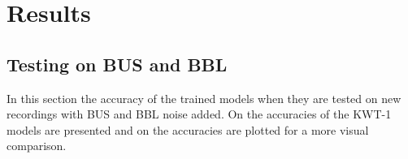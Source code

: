 \section{Results} \label{results}

\subsection{Testing on BUS and BBL} \label{subsec:test1}
In this section the accuracy of the trained models when they are tested on new recordings with BUS and BBL noise added. On  the accuracies of the KWT-1 models are presented and on  the accuracies are plotted for a more visual comparison. 

